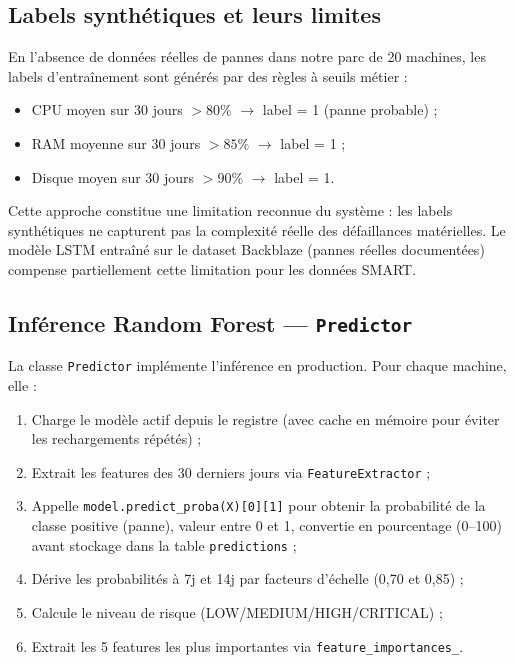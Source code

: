\subsection{Labels synthétiques et leurs limites}

En l'absence de données réelles de pannes dans notre parc de 20 machines, les labels
d'entraînement sont générés par des règles à seuils métier :

\begin{itemize}
  \item CPU moyen sur 30 jours $> 80\%$ $\rightarrow$ label = 1 (panne probable) ;
  \item RAM moyenne sur 30 jours $> 85\%$ $\rightarrow$ label = 1 ;
  \item Disque moyen sur 30 jours $> 90\%$ $\rightarrow$ label = 1.
\end{itemize}

Cette approche constitue une limitation reconnue du système : les labels synthétiques
ne capturent pas la complexité réelle des défaillances matérielles. Le modèle LSTM
entraîné sur le dataset Backblaze (pannes réelles documentées) compense partiellement
cette limitation pour les données SMART.

\subsection{Inférence Random Forest — \texttt{Predictor}}

La classe \texttt{Predictor} implémente l'inférence en production. Pour chaque machine,
elle :
\begin{enumerate}
  \item Charge le modèle actif depuis le registre (avec cache en mémoire pour éviter
        les rechargements répétés) ;
  \item Extrait les features des 30 derniers jours via \texttt{FeatureExtractor} ;
  \item Appelle \texttt{model.predict\_proba(X)[0][1]} pour obtenir la probabilité
        de la classe positive (panne), valeur entre 0 et 1, convertie en pourcentage
        (0--100) avant stockage dans la table \texttt{predictions} ;
  \item Dérive les probabilités à 7j et 14j par facteurs d'échelle (0,70 et 0,85) ;
  \item Calcule le niveau de risque (LOW/MEDIUM/HIGH/CRITICAL) ;
  \item Extrait les 5 features les plus importantes via \texttt{feature\_importances\_}.
\end{enumerate}

